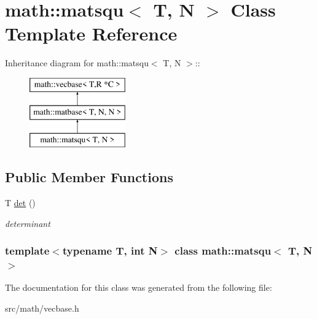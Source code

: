 \hypertarget{classmath_1_1matsqu}{
\section{math::matsqu$<$ T, N $>$ Class Template Reference}
\label{classmath_1_1matsqu}
}
Inheritance diagram for math::matsqu$<$ T, N $>$::\begin{figure}[H]
\begin{center}
\leavevmode
\includegraphics[height=3cm]{classmath_1_1matsqu}
\end{center}
\end{figure}
\subsection*{Public Member Functions}
\begin{DoxyCompactItemize}
\item 
\hypertarget{classmath_1_1matsqu_a04647ad3f7539a9aac5654a2e569682a}{
T \hyperlink{classmath_1_1matsqu_a04647ad3f7539a9aac5654a2e569682a}{det} ()}
\label{classmath_1_1matsqu_a04647ad3f7539a9aac5654a2e569682a}

\begin{DoxyCompactList}\small\item\em determinant \item\end{DoxyCompactList}\end{DoxyCompactItemize}
\subsubsection*{template$<$typename T, int N$>$ class math::matsqu$<$ T, N $>$}



The documentation for this class was generated from the following file:\begin{DoxyCompactItemize}
\item 
src/math/vecbase.h\end{DoxyCompactItemize}
